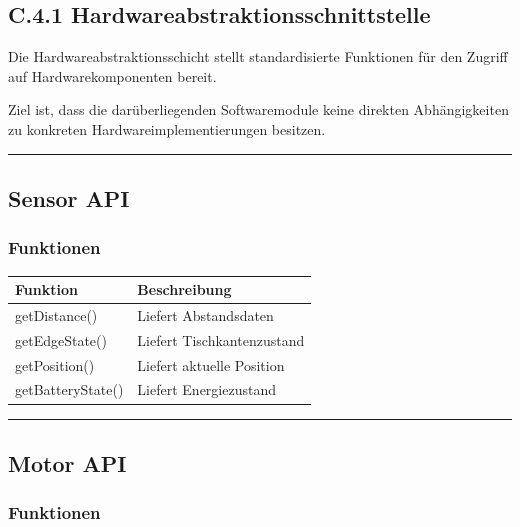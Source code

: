 \documentclass[
]{article}
\begin{document}
\subsection{C.4.1
Hardwareabstraktionsschnittstelle}\label{c.4.1-hardwareabstraktionsschnittstelle}

Die Hardwareabstraktionsschicht stellt standardisierte Funktionen für
den Zugriff auf Hardwarekomponenten bereit.

Ziel ist, dass die darüberliegenden Softwaremodule keine direkten
Abhängigkeiten zu konkreten Hardwareimplementierungen besitzen.

\begin{center}\rule{0.5\linewidth}{0.5pt}\end{center}

\subsection{Sensor API}\label{sensor-api}

\subsubsection{Funktionen}\label{funktionen-5}

\begin{longtable}[]{@{}ll@{}}
\toprule\noalign{}
Funktion & Beschreibung \\
\midrule\noalign{}
\endhead
\bottomrule\noalign{}
\endlastfoot
getDistance() & Liefert Abstandsdaten \\
getEdgeState() & Liefert Tischkantenzustand \\
getPosition() & Liefert aktuelle Position \\
getBatteryState() & Liefert Energiezustand \\
\end{longtable}

\begin{center}\rule{0.5\linewidth}{0.5pt}\end{center}

\subsection{Motor API}\label{motor-api}

\subsubsection{Funktionen}\label{funktionen-6}
\end{document}
